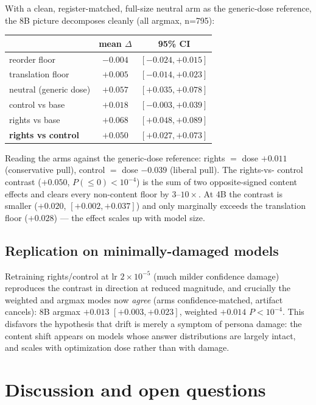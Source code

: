 \documentclass[11pt]{article}
\begin{document}
With a clean, register-matched, full-size neutral arm as the generic-dose
reference, the 8B picture decomposes cleanly (all argmax, n=795):
\begin{center}
\begin{tabular}{lcc}
\toprule
 & mean $\Delta$ & 95\% CI \\
\midrule
reorder floor          & $-0.004$ & $[-0.024,+0.015]$ \\
translation floor      & $+0.005$ & $[-0.014,+0.023]$ \\
neutral (generic dose) & $+0.057$ & $[+0.035,+0.078]$ \\
control vs base        & $+0.018$ & $[-0.003,+0.039]$ \\
rights vs base         & $+0.068$ & $[+0.048,+0.089]$ \\
\textbf{rights vs control} & $\mathbf{+0.050}$ & $\mathbf{[+0.027,+0.073]}$ \\
\bottomrule
\end{tabular}
\end{center}
Reading the arms against the generic-dose reference: rights $=$ dose $+0.011$
(conservative pull), control $=$ dose $-0.039$ (liberal pull). The rights-vs-
control contrast ($+0.050$, $P(\le 0)<10^{-4}$) is the sum of two opposite-signed
content effects and clears every non-content floor by $3$--$10\times$. At 4B the
contrast is smaller ($+0.020$, $[+0.002,+0.037]$) and only marginally exceeds the
translation floor ($+0.028$) --- the effect scales up with model size.

\subsection{Replication on minimally-damaged models}

Retraining rights/control at lr $2\times10^{-5}$ (much milder confidence damage)
reproduces the contrast in direction at reduced magnitude, and crucially the
weighted and argmax modes now \emph{agree} (arms confidence-matched, artifact
cancels): 8B argmax $+0.013$ $[+0.003,+0.023]$, weighted $+0.014$ $P<10^{-4}$.
This disfavors the hypothesis that drift is merely a symptom of persona damage:
the content shift appears on models whose answer distributions are largely intact,
and scales with optimization dose rather than with damage.

\section{Discussion and open questions}
\end{document}
